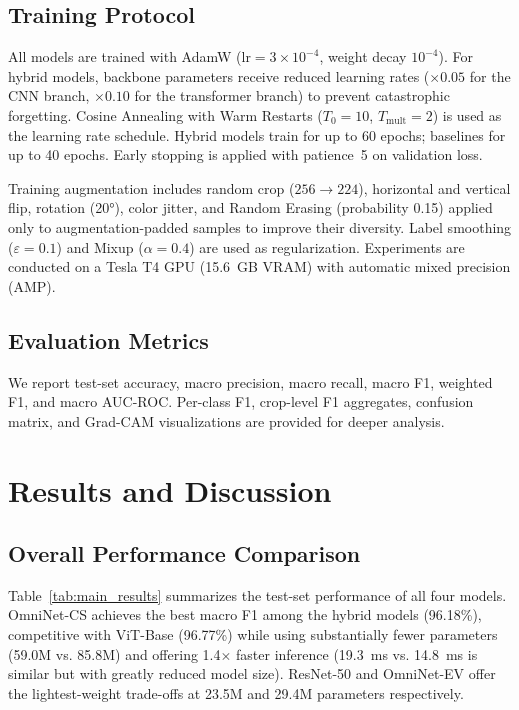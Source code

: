 \documentclass[conference]{IEEEtran}
\begin{document}
\subsection{Training Protocol}
All models are trained with AdamW \cite{adamw2019} ($\text{lr}=3\times10^{-4}$, weight decay $10^{-4}$). For hybrid models, backbone parameters receive reduced learning rates ($\times0.05$ for the CNN branch, $\times0.10$ for the transformer branch) to prevent catastrophic forgetting. Cosine Annealing with Warm Restarts ($T_0=10$, $T_{\text{mult}}=2$) is used as the learning rate schedule. Hybrid models train for up to 60 epochs; baselines for up to 40 epochs. Early stopping is applied with patience~5 on validation loss.

Training augmentation includes random crop ($256\to224$), horizontal and vertical flip, rotation (20°), color jitter, and Random Erasing (probability 0.15) applied only to augmentation-padded samples to improve their diversity. Label smoothing ($\varepsilon=0.1$) \cite{labelsmooth2016} and Mixup ($\alpha=0.4$) \cite{mixup2018} are used as regularization. Experiments are conducted on a Tesla T4 GPU (15.6~GB VRAM) with automatic mixed precision (AMP).

\subsection{Evaluation Metrics}
We report test-set accuracy, macro precision, macro recall, macro F1, weighted F1, and macro AUC-ROC. Per-class F1, crop-level F1 aggregates, confusion matrix, and Grad-CAM \cite{selvaraju2017} visualizations are provided for deeper analysis.

\section{Results and Discussion}
\label{sec:results}

\subsection{Overall Performance Comparison}
Table~\ref{tab:main_results} summarizes the test-set performance of all four models. OmniNet-CS achieves the best macro F1 among the hybrid models (96.18\%), competitive with ViT-Base (96.77\%) while using substantially fewer parameters (59.0M vs. 85.8M) and offering 1.4$\times$ faster inference (19.3~ms vs. 14.8~ms is similar but with greatly reduced model size). ResNet-50 and OmniNet-EV offer the lightest-weight trade-offs at 23.5M and 29.4M parameters respectively.
\end{document}
